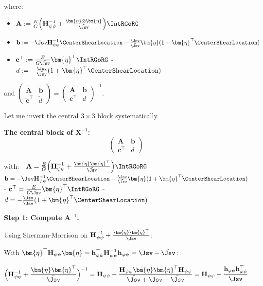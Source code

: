 where: 
\begin{itemize}
\item 
\(\mathbf{A} := \frac{E}{G}\Big(\mathbf{H}_{\psi\psi}^{-1} + \frac{\bm{\eta}\otimes\bm{\eta}}{\tilde{\Jsv}}\Big)\IntRGoRG\)
\item
\(\mathbf{b} := -\Jsv\mathbf{H}_{\psi\psi}^{-1}\CenterShearLocation - \frac{\Jsv}{\tilde{\Jsv}}\bm{\eta}(1 + \bm{\eta}^\top\CenterShearLocation)\)
\item \(\mathbf{c}^\top := \frac{E}{G\tilde{\Jsv}}\bm{\eta}^\top\IntRGoRG\) -
\(d := -\frac{\Jsv}{\tilde{\Jsv}}(1 + \bm{\eta}^\top\CenterShearLocation)\)
\end{itemize}


and
\(\begin{pmatrix} \tilde{\mathbf{A}} & \tilde{\mathbf{b}} \\ \tilde{\mathbf{c}}^\top & \tilde{d} \end{pmatrix} = \begin{pmatrix} \mathbf{A} & \mathbf{b} \\ \mathbf{c}^\top & d \end{pmatrix}^{-1}\).

Let me invert the central \(3 \times 3\) block systematically.

\textbf{The central block of \(\mathbf{X}^{-1}\):}
\[\begin{pmatrix} \mathbf{A} & \mathbf{b} \\ \mathbf{c}^\top & d \end{pmatrix}\]

with: -
\(\mathbf{A} = \frac{E}{G}\Big(\mathbf{H}_{\psi\psi}^{-1} + \frac{\bm{\eta}\bm{\eta}^\top}{\tilde{\Jsv}}\Big)\IntRGoRG\)
-
\(\mathbf{b} = -\Jsv\mathbf{H}_{\psi\psi}^{-1}\CenterShearLocation - \frac{\Jsv}{\tilde{\Jsv}}\bm{\eta}(1 + \bm{\eta}^\top\CenterShearLocation)\)
- \(\mathbf{c}^\top = \frac{E}{G\tilde{\Jsv}}\bm{\eta}^\top\IntRGoRG\) -
\(d = -\frac{\Jsv}{\tilde{\Jsv}}(1 + \bm{\eta}^\top\CenterShearLocation)\)

\textbf{Step 1: Compute \(\mathbf{A}^{-1}\).}

Using Sherman-Morrison on
\(\mathbf{H}_{\psi\psi}^{-1} + \frac{\bm{\eta}\bm{\eta}^\top}{\tilde{\Jsv}}\):

With
\(\bm{\eta}^\top\mathbf{H}_{\psi\psi}\bm{\eta} = \mathbf{h}_{\varphi\psi}^\top\mathbf{H}_{\psi\psi}^{-1}\mathbf{h}_{\varphi\psi} = \Jsv - \tilde{\Jsv}\):

\[\Big(\mathbf{H}_{\psi\psi}^{-1} + \frac{\bm{\eta}\bm{\eta}^\top}{\tilde{\Jsv}}\Big)^{-1} = \mathbf{H}_{\psi\psi} - \frac{\mathbf{H}_{\psi\psi}\bm{\eta}\bm{\eta}^\top\mathbf{H}_{\psi\psi}}{\tilde{\Jsv} + \Jsv - \tilde{\Jsv}} = \mathbf{H}_{\psi\psi} - \frac{\mathbf{h}_{\varphi\psi}\mathbf{h}_{\varphi\psi}^\top}{\Jsv}\]

